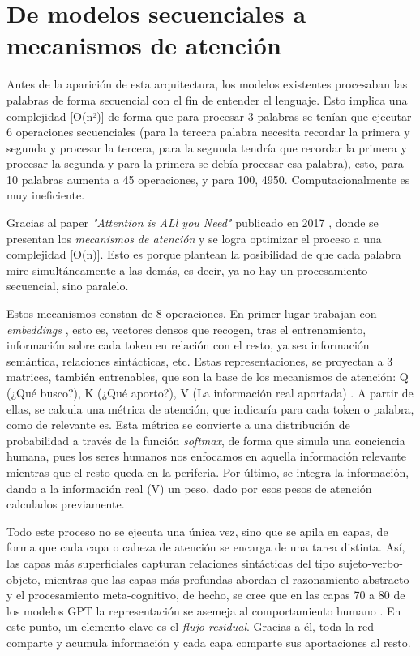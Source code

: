 \documentclass[11pt]{book}
\begin{document}
\section{De modelos secuenciales a mecanismos de atención}
Antes de la aparición de esta arquitectura, los modelos existentes procesaban las palabras de forma secuencial con el fin de entender el lenguaje. Esto implica una complejidad [O(n²)] de forma que para procesar 3 palabras se tenían que ejecutar 6 operaciones secuenciales (para la tercera palabra necesita recordar la primera y segunda y procesar la tercera, para la segunda tendría que recordar la primera y procesar la segunda y para la primera se debía procesar esa palabra), esto, para 10 palabras aumenta a 45 operaciones, y para 100, 4950. Computacionalmente es muy ineficiente. 

Gracias al paper \textit{"Attention is ALl you Need"} publicado en 2017 \parencite{vaswani2017attention}, donde se presentan los \textit{mecanismos de atención} y se logra optimizar el proceso a una complejidad [O(n)]. Esto es porque plantean la posibilidad de que cada palabra mire simultáneamente a las demás, es decir, ya no hay un procesamiento secuencial, sino paralelo. 

Estos mecanismos constan de 8 operaciones. En primer lugar trabajan con \textit{embeddings} \parencite{neuraforge2023guide}, esto es, vectores densos que recogen, tras el entrenamiento, información sobre cada token en relación con el resto, ya sea información semántica, relaciones sintácticas, etc. Estas representaciones, se proyectan a 3 matrices, también entrenables, que son la base de los mecanismos de atención: Q (¿Qué busco?), K (¿Qué aporto?), V (La información real aportada) \parencite{epichka2023qkv}. A partir de ellas, se calcula una métrica de atención, que indicaría para cada token o palabra, como de relevante es. Esta métrica se convierte a una distribución de probabilidad a través de la función \textit{softmax}, de forma que simula una conciencia humana, pues los seres humanos nos enfocamos en aquella información relevante mientras que el resto queda en la periferia. Por último, se integra la información, dando a la información real (V) un peso, dado por esos pesos de atención calculados previamente.

Todo este proceso no se ejecuta una única vez, sino que se apila en capas, de forma que cada capa o cabeza de atención se encarga de una tarea distinta. Así, las capas más superficiales capturan relaciones sintácticas del tipo sujeto-verbo-objeto, mientras que las capas más profundas abordan el razonamiento abstracto y el procesamiento meta-cognitivo, de hecho, se cree que en las capas 70 a 80 de los modelos GPT la representación se asemeja al comportamiento humano \parencite{plainenglish2021gpt}. En este punto, un elemento clave es el \textit{flujo residual}. Gracias a él, toda la red comparte y acumula información y cada capa comparte sus aportaciones al resto. 
\end{document}
